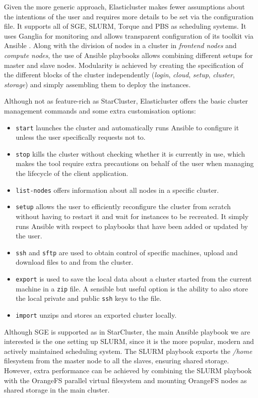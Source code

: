 Given the more generic approach, Elasticluster makes fewer assumptions about the intentions of the user and requires more details to be set via the configuration file. It supports all of SGE, SLURM, Torque and PBS as scheduling systems. It uses Ganglia \cite{Ganglia} for monitoring and allows transparent configuration of its toolkit via Ansible \cite{Ansible}. Along with the division of nodes in a cluster in \textit{frontend nodes} and \textit{compute nodes}, the use of Ansible playbooks allows combining different setups for master and slave nodes. Modularity is achieved by creating the specification of the different blocks of the cluster independently (\textit{login}, \textit{cloud}, \textit{setup}, \textit{cluster}, \textit{storage}) and simply assembling them to deploy the instances.

Although not as feature-rich as StarCluster, Elasticluster offers the basic cluster management commands and some extra customisation options:
\begin{itemize}
	\item \verb|start| launches the cluster and automatically runs Ansible to configure it unless the user specifically requests not to.
	\item \verb|stop| kills the cluster without checking whether it is currently in use, which makes the tool require extra precautions on behalf of the user when managing the lifecycle of the client application.
	\item \verb|list-nodes| offers information about all nodes in a specific cluster.
	\item \verb|setup| allows the user to efficiently reconfigure the cluster from scratch without having to restart it and wait for instances to be recreated. It simply runs Ansible with respect to playbooks that have been added or updated by the user.
	\item \verb|ssh| and \verb|sftp| are used to obtain control of specific machines, upload and download files to and from the 
cluster.
	\item \verb|export| is used to save the local data about a cluster started from the current machine in a \verb|zip| file. A sensible but useful option is the ability to also store the local private and public \verb|ssh| keys to the file.
	\item \verb|import| unzips and stores an exported cluster locally.
\end{itemize}

Although SGE is supported as in StarCluster, the main Ansible playbook we are interested is the one setting up SLURM, since it is the more popular, modern and actively maintained scheduling system. The SLURM playbook exports the \textit{/home} filesystem from the master node to all the slaves, ensuring shared storage. However, extra performance can be achieved by combining the SLURM playbook with the OrangeFS parallel virtual filesystem and mounting OrangeFS nodes as shared storage in the main cluster.

